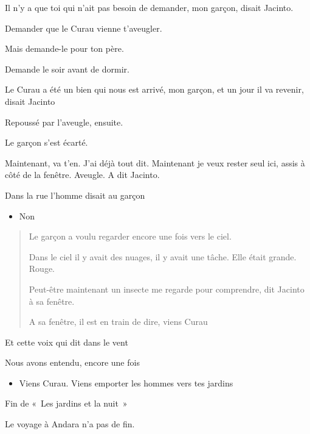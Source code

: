 Il n'y a que toi qui n'ait pas besoin de demander, mon garçon, disait
Jacinto.

Demander que le Curau vienne t'aveugler.

Mais demande-le pour ton père.

Demande le soir avant de dormir.

Le Curau a été un bien qui nous est arrivé, mon garçon, et un jour il va
revenir, disait Jacinto

Repoussé par l'aveugle, ensuite.

Le garçon s'est écarté.

Maintenant, va t'en. J'ai déjà tout dit. Maintenant je veux rester seul
ici, assis à côté de la fenêtre. Aveugle. A dit Jacinto.

Dans la rue l'homme disait au garçon

\begin{itemize}
\item
  Non
\end{itemize}

\begin{quote}
Le garçon a voulu regarder encore une fois vers le ciel.

Dans le ciel il y avait des nuages, il y avait une tâche. Elle était
grande. Rouge.

Peut-être maintenant un insecte me regarde pour comprendre, dit Jacinto
à sa fenêtre.

A sa fenêtre, il est en train de dire, viens Curau
\end{quote}

Et cette voix qui dit dans le vent

Nous avons entendu, encore une fois

\begin{itemize}
\item
  Viens Curau. Viens emporter les hommes vers tes jardins
\end{itemize}

Fin de «~Les jardins et la nuit~»

Le voyage à Andara n'a pas de fin.
